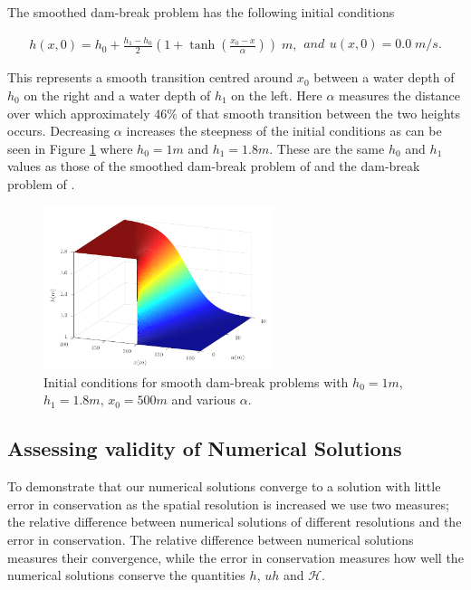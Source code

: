 \documentclass[times]{elsarticle}
\begin{document}
The smoothed dam-break problem has the following initial conditions
\begin{linenomath*}
\begin{subequations}
\begin{gather}
h(x,0) = h_0 + \frac{h_1 - h_0}{2}\left(1 + \tanh\left(\frac{x_0 - x}{\alpha}\right)\right)\; m,
\end{gather} 
and
\begin{gather}
u(x,0) = 0.0 \;m/s.
\end{gather}
\label{eq:sdbi}
\end{subequations}
\end{linenomath*}
This represents a smooth transition centred around $x_0$ between a water depth of $h_0$ on the right and a water depth of $h_1$ on the left. Here $\alpha$ measures the distance over which approximately $46\%$ of that smooth transition between the two heights occurs. Decreasing $\alpha$ increases the steepness of the initial conditions as can be seen in Figure \ref{fig:dbsmoothinit} where $h_0=1m$ and $h_1=1.8m$. These are the same $h_0$ and $h_1$ values as those of the smoothed dam-break problem of \citet{El-etal-2006} and the dam-break problem of \citet{Hank-etal-2010-2034}.
\begin{figure}
\centering
\includegraphics[width=0.6\textwidth]{pics/explainers/dbs.pdf}
\caption{Initial conditions for smooth dam-break problems with $h_0 = 1m$, $h_1 = 1.8m$, $x_0 =500m$ and various $\alpha$.}
\label{fig:dbsmoothinit}
\end{figure}
%
\subsection{Assessing validity of Numerical Solutions}
To demonstrate that our numerical solutions converge to a solution with little error in conservation as the spatial resolution is increased we use two measures; the relative difference between numerical solutions of different resolutions and the error in conservation. The relative difference between numerical solutions measures their convergence, while the error in conservation measures how well the numerical solutions conserve the quantities $h$, $uh$ and $\mathcal{H}$.
\end{document}
